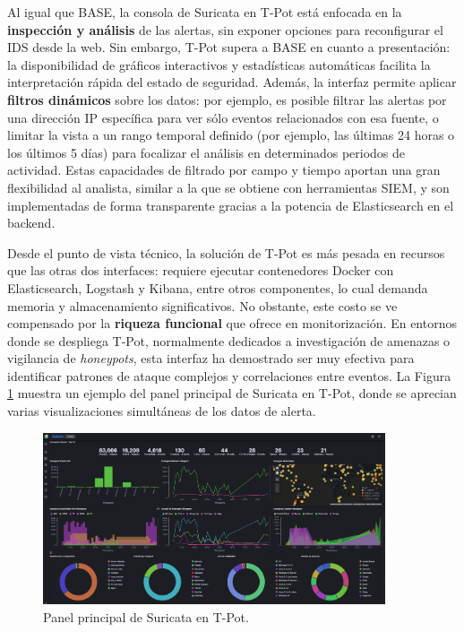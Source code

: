 \documentclass[11pt,a4paper,twoside]{report}
\begin{document}
Al igual que BASE, la consola de Suricata en T-Pot está enfocada en la \textbf{inspección y análisis} de las alertas, sin exponer opciones para reconfigurar el IDS desde la web. Sin embargo, T-Pot supera a BASE en cuanto a presentación: la disponibilidad de gráficos interactivos y estadísticas automáticas facilita la interpretación rápida del estado de seguridad. Además, la interfaz permite aplicar \textbf{filtros dinámicos} sobre los datos: por ejemplo, es posible filtrar las alertas por una dirección IP específica para ver sólo eventos relacionados con esa fuente, o limitar la vista a un rango temporal definido (por ejemplo, las últimas 24 horas o los últimos 5 días) para focalizar el análisis en determinados periodos de actividad. Estas capacidades de filtrado por campo y tiempo aportan una gran flexibilidad al analista, similar a la que se obtiene con herramientas SIEM, y son implementadas de forma transparente gracias a la potencia de Elasticsearch en el backend.\newline

Desde el punto de vista técnico, la solución de T-Pot es más pesada en recursos que las otras dos interfaces: requiere ejecutar contenedores Docker con Elasticsearch, Logstash y Kibana, entre otros componentes, lo cual demanda memoria y almacenamiento significativos. No obstante, este costo se ve compensado por la \textbf{riqueza funcional} que ofrece en monitorización. En entornos donde se despliega T-Pot, normalmente dedicados a investigación de amenazas o vigilancia de \emph{honeypots}, esta interfaz ha demostrado ser muy efectiva para identificar patrones de ataque complejos y correlaciones entre eventos. La Figura \ref{fig:tpot-dashboard} muestra un ejemplo del panel principal de Suricata en T-Pot, donde se aprecian varias visualizaciones simultáneas de los datos de alerta.\newline

\begin{figure}[H]
	\centering
	\includegraphics[width=0.9\textwidth]{documento/3.png}
	\caption{Panel principal de Suricata en T-Pot.}
	\label{fig:tpot-dashboard}
\end{figure}
\end{document}
